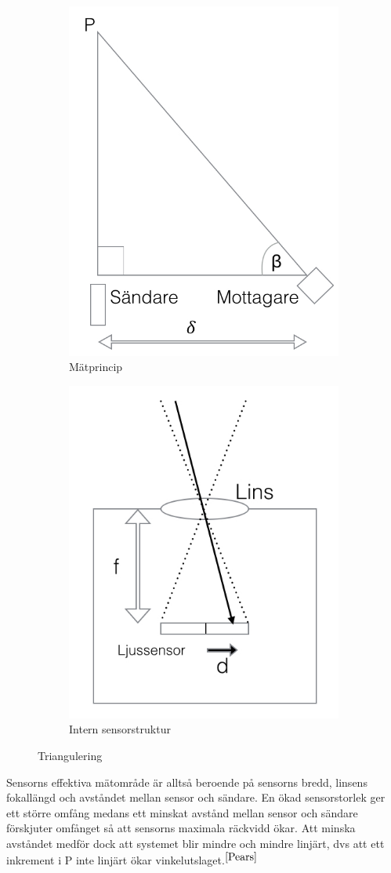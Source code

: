 \documentclass[a4paper,12pt,fleqn]{article}
\begin{document}
\begin{figure}
\centering
\begin{subfigure}{.5\textwidth}
  \centering
  \includegraphics[width=.5\linewidth]{Traingulering001.jpg}
  \caption{Mätprincip}
  \label{fig:sub1}
\end{subfigure}%
\begin{subfigure}{.5\textwidth}
  \centering
  \includegraphics[width=.5\linewidth]{Traingulering002.jpg}
  \caption{Intern sensorstruktur}
  \label{fig:sub2}
\end{subfigure}
\caption{Triangulering}
\label{fig:sub}
\end{figure}



Sensorns effektiva mätområde är alltså beroende på sensorns bredd, linsens fokallängd och avståndet mellan sensor och sändare.
En ökad sensorstorlek ger ett större omfång medans ett minskat avstånd mellan sensor och sändare förskjuter omfånget så att sensorns maximala räckvidd ökar. Att minska avståndet medför dock att systemet blir mindre och mindre linjärt, dvs att ett inkrement i P inte linjärt ökar vinkelutslaget.$^{\ref{Pears}}$
\end{document}
